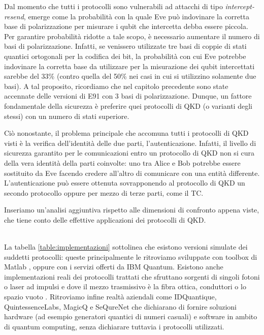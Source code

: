 Dal momento che tutti i protocolli sono vulnerabili ad attacchi di tipo \textit{intercept-resend}, emerge come la probabilità con la quale Eve può indovinare la corretta base di polarizzazione per misurare i qubit che intercetta debba essere piccola. Per garantire probabilità ridotte a tale scopo, è necessario aumentare il numero di basi di polarizzazione. Infatti, se venissero utilizzate tre basi di coppie di stati quantici ortogonali per la codifica dei bit, la probabilità con cui Eve potrebbe indovinare la corretta base da utilizzare per la misurazione dei qubit intercettati sarebbe del 33\% (contro quella del 50\% nei casi in cui si utilizzino solamente due basi). A tal proposito, ricordiamo che nel capitolo precedente sono state accennate delle versioni di E91 con 3 basi di polarizzazione. Dunque, un fattore fondamentale della sicurezza è preferire quei protocolli di QKD (o varianti degli stessi) con un numero di stati superiore. 

Ciò nonostante, il problema principale che accomuna tutti i protocolli di QKD visti è la verifica dell'identità delle due parti, l'autenticazione. Infatti, il livello di sicurezza garantito per le comunicazioni entro un protocollo di QKD non si cura della vera identità della parti coinvolte: uno tra Alice e Bob potrebbe essere sostituito da Eve facendo credere all'altro di comunicare con una entità differente. L'autenticazione può essere ottenuta sovrapponendo al protocollo di QKD un secondo protocollo oppure per mezzo di terze parti, come il TC.

Inseriamo un'analisi aggiuntiva rispetto alle dimensioni di confronto appena viste, che tiene conto delle effettive applicazioni dei protocolli di QKD.

\\ La tabella \ref{table:implementazioni} sottolinea che esistono versioni simulate dei suddetti protocolli: queste principalmente le ritroviamo sviluppate con toolbox di Matlab \cite{matlab_impl}, oppure con i servizi offerti da IBM Quantum. Esistono anche implementazioni reali dei protocolli trattati che sfruttano sorgenti di singoli fotoni o laser ad impulsi e dove il mezzo trasmissivo è la fibra ottica, conduttori o lo spazio vuoto \cite{knight} \cite{hughes} \cite{ent_impl}. Ritroviamo infine realtà aziendali come  IDQuantique, QuintessenceLabs, MagicQ e SeQureNet che dichiarano di fornire soluzioni hardware (ad esempio generatori quantici di numeri casuali) e software in ambito di quantum computing, senza dichiarare tuttavia i protocolli utilizzati.

